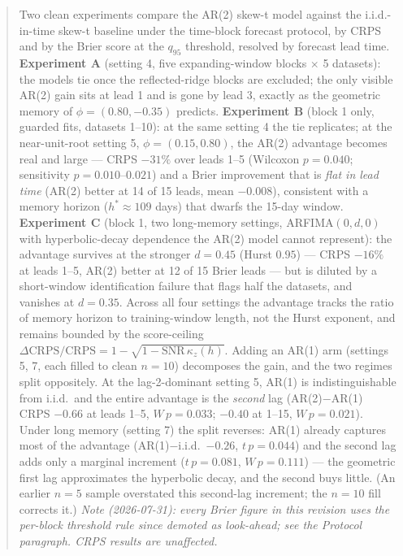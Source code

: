 \documentclass[11pt]{article}
\begin{document}
\begin{abstract}
Two clean experiments compare the AR(2) skew-t model against the
i.i.d.-in-time skew-t baseline under the time-block forecast protocol, by
CRPS and by the Brier score at the $q_{95}$ threshold, resolved by forecast
lead time. \textbf{Experiment A} (setting 4, five expanding-window blocks
$\times$ 5 datasets): the models tie once the reflected-ridge blocks are
excluded; the only visible AR(2) gain sits at lead 1 and is gone by lead 3,
exactly as the geometric memory of $\phi = (0.80, -0.35)$ predicts.
\textbf{Experiment B} (block 1 only, guarded fits, datasets 1--10): at the
same setting 4 the tie replicates; at the near-unit-root setting 5,
$\phi = (0.15, 0.80)$, the AR(2) advantage becomes real and large --- CRPS
$-31\%$ over leads 1--5 (Wilcoxon $p = 0.040$; sensitivity $p = 0.010$--$0.021$)
and a Brier improvement that is \emph{flat in lead time} (AR(2) better at 14
of 15 leads, mean $-0.008$), consistent with a memory horizon
($h^\ast \approx 109$ days) that dwarfs the 15-day window.
\textbf{Experiment C} (block 1, two long-memory settings, ARFIMA$(0,d,0)$ with
hyperbolic-decay dependence the AR(2) model cannot represent): the advantage
survives at the stronger $d = 0.45$ (Hurst $0.95$) --- CRPS $-16\%$ at leads
1--5, AR(2) better at 12 of 15 Brier leads --- but is diluted by a short-window
identification failure that flags half the datasets, and vanishes at
$d = 0.35$. Across all four settings the advantage tracks the ratio of memory
horizon to training-window length, not the Hurst exponent, and remains
bounded by the score-ceiling
$\Delta\mathrm{CRPS}/\mathrm{CRPS} = 1 - \sqrt{1 - \mathrm{SNR}\,\kappa_z(h)}$.
Adding an AR(1) arm (settings 5, 7, each filled to clean $n = 10$) decomposes
the gain, and the two regimes split oppositely. At the lag-2-dominant
setting 5, AR(1) is indistinguishable from i.i.d.\ and the entire advantage is
the \emph{second} lag (AR(2)$-$AR(1) CRPS $-0.66$ at leads 1--5,
$W\,p = 0.033$; $-0.40$ at 1--15, $W\,p = 0.021$). Under long memory
(setting 7) the split reverses: AR(1) already captures most of the advantage
(AR(1)$-$i.i.d.\ $-0.26$, $t\,p = 0.044$) and the second lag adds only a
marginal increment ($t\,p = 0.081$, $W\,p = 0.111$) --- the geometric first
lag approximates the hyperbolic decay, and the second buys little. (An earlier
$n = 5$ sample overstated this second-lag increment; the $n = 10$ fill
corrects it.)
\emph{Note (2026-07-31): every Brier figure in this revision uses the
per-block threshold rule since demoted as look-ahead; see the Protocol
paragraph. CRPS results are unaffected.}
\end{abstract}
\end{document}
